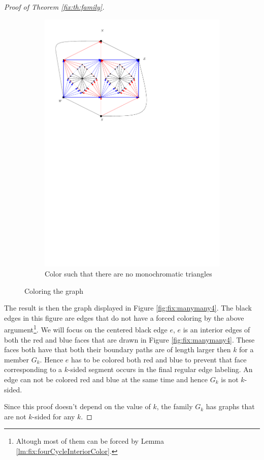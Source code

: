 \begin{proof}[Proof of Theorem \ref{fix:th:family}]
\begin{figure}[h]
\begin{subfigure}[t]{0.3\textwidth}
      \includegraphics[width=\textwidth]{fixExtension/img/manymany3}
      \caption{Color such that there are no monochromatic triangles}
      \label{fig:fix:manymany3}
    \end{subfigure}
    \caption{Coloring the graph}
    \label{fig:fix:coloring}
  \end{figure}

  The result is then the graph displayed in Figure \ref{fig:fix:manymany4}. The black edges in this figure are edges that do not have a forced coloring by the above argument\footnote{Altough most of them can be forced by Lemma \ref{lm:fix:fourCycleInteriorColor}.}.
  We will focus on the centered black edge $e$, $e$ is an interior edges of both the red and blue faces that are drawn  in Figure \ref{fig:fix:manymany4}. These faces both have that both their boundary paths are of length larger then $k$ for a member $G_k$. Hence $e$ has to be colored both red and blue to prevent that face corresponding to a $k$-sided segment occurs in the final regular edge labeling. An edge can not be colored red and blue at the same time and hence $G_k$ is not $k$-sided.

  Since this proof doesn't depend on the value of $k$, the family $G_k$ has graphs that are not $k$-sided for any $k$.
\end{proof}


